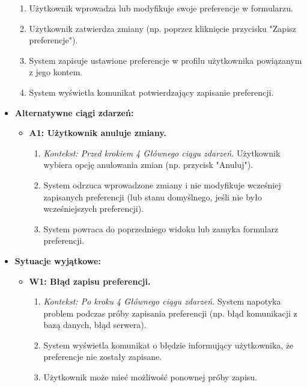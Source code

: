 \documentclass[a4paper,12pt]{article}
\begin{document}
\begin{itemize}
\begin{enumerate}
            \item Użytkownik wprowadza lub modyfikuje swoje preferencje w formularzu.
            \item Użytkownik zatwierdza zmiany (np. poprzez kliknięcie przycisku "Zapisz preferencje").
            \item System zapisuje ustawione preferencje w profilu użytkownika powiązanym z jego kontem.
            \item System wyświetla komunikat potwierdzający zapisanie preferencji.
        \end{enumerate}
    \item \textbf{Alternatywne ciągi zdarzeń:}
        \begin{itemize}
            \item \textbf{A1: Użytkownik anuluje zmiany.}
                \begin{enumerate}
                    \item \textit{Kontekst: Przed krokiem 4 Głównego ciągu zdarzeń.} Użytkownik wybiera opcję anulowania zmian (np. przycisk "Anuluj").
                    \item System odrzuca wprowadzone zmiany i nie modyfikuje wcześniej zapisanych preferencji (lub stanu domyślnego, jeśli nie było wcześniejszych preferencji).
                    \item System powraca do poprzedniego widoku lub zamyka formularz preferencji.
                \end{enumerate}
        \end{itemize}
    \item \textbf{Sytuacje wyjątkowe:}
        \begin{itemize}
            \item \textbf{W1: Błąd zapisu preferencji.}
                \begin{enumerate}
                    \item \textit{Kontekst: Po kroku 4 Głównego ciągu zdarzeń.} System napotyka problem podczas próby zapisania preferencji (np. błąd komunikacji z bazą danych, błąd serwera).
                    \item System wyświetla komunikat o błędzie informujący użytkownika, że preferencje nie zostały zapisane.
                    \item Użytkownik może mieć możliwość ponownej próby zapisu.
                \end{enumerate}
        \end{itemize}
\end{itemize}
\end{document}
